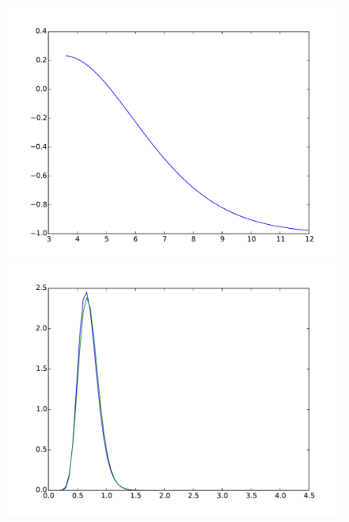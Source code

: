 \documentclass{article}
\begin{document}
\begin{figure}[htb]
\begin{minipage}{.3\textwidth}
	\end{minipage}
	\begin{minipage}{.3\textwidth}
		\centering
		\includegraphics[width=0.97\linewidth]{bootstrap-filter/relative_tail_simple_4_3.pdf}
	\end{minipage}
	\begin{minipage}{.3\textwidth}
		\centering
		\includegraphics[width=0.97\linewidth]{bootstrap-filter/global_simple_3_1.pdf}
	\end{minipage}
	\begin{minipage}{.3\textwidth}
		\centering

\end{minipage}
\end{figure}
\end{document}
